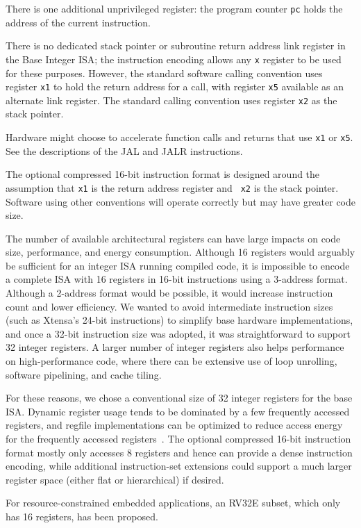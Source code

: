 There is one additional unprivileged register: the program counter {\tt pc}
holds the address of the current instruction.

\begin{commentary}
There is no dedicated stack pointer or subroutine return address link
register in the Base Integer ISA; the instruction encoding allows any
{\tt x} register to be used for these purposes. However, the standard
software calling convention uses register {\tt x1} to hold the return
address for a call, with register {\tt x5} available as an alternate
link register.
The standard calling convention uses register {\tt x2} as the stack
pointer.

Hardware might choose to accelerate function calls and returns that
use {\tt x1} or {\tt x5}. See the descriptions of the JAL and JALR
instructions.

The optional compressed 16-bit instruction format is designed around
the assumption that {\tt x1} is the return address register and {\tt
 x2} is the stack pointer. Software using other conventions will
operate correctly but may have greater code size.

The number of available architectural registers can have large impacts
on code size, performance, and energy consumption.  Although 16
registers would arguably be sufficient for an integer ISA running
compiled code, it is impossible to encode a complete ISA with 16
registers in 16-bit instructions using a 3-address format.  Although a
2-address format would be possible, it would increase instruction
count and lower efficiency.  We wanted to avoid intermediate
instruction sizes (such as Xtensa's 24-bit instructions) to simplify
base hardware implementations, and once a 32-bit instruction size was
adopted, it was straightforward to support 32 integer registers.  A
larger number of integer registers also helps performance on
high-performance code, where there can be extensive use of loop
unrolling, software pipelining, and cache tiling.

For these reasons, we chose a conventional size of 32 integer
registers for the base ISA.  Dynamic register usage tends to be
dominated by a few frequently accessed registers, and regfile
implementations can be optimized to reduce access energy for the
frequently accessed registers~\cite{jtseng:sbbci}.  The optional
compressed 16-bit instruction format mostly only accesses 8 registers
and hence can provide a dense instruction encoding, while additional
instruction-set extensions could support a much larger register space
(either flat or hierarchical) if desired.

For resource-constrained embedded applications, an
RV32E subset, which only has 16 registers, has been proposed.
\end{commentary}

